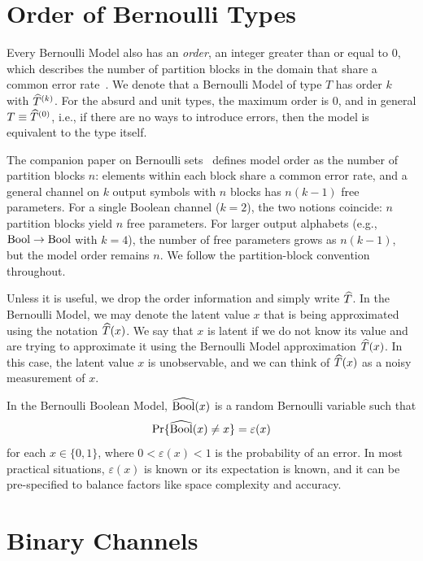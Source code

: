 \documentclass[../main.tex]{subfiles}
\begin{document}
\section{Order of Bernoulli Types}

Every Bernoulli Model also has an \emph{order}, an integer greater than or equal to 0, which describes the number of partition blocks in the domain that share a common error rate~\cite{bernoulliSets}. We denote that a Bernoulli Model of type $T$ has order $k$ with $\widehat{T}^{(k)}$. For the absurd and unit types, the maximum order is $0$, and in general $T \equiv \widehat{T}^{(0)}$, i.e., if there are no ways to introduce errors, then the model is equivalent to the type itself.

\begin{remark}
\label{rem:order_vs_dof}
The companion paper on Bernoulli sets~\cite{bernoulliSets} defines model order as the number of partition blocks $n$: elements within each block share a common error rate, and a general channel on $k$ output symbols with $n$ blocks has $n(k-1)$ free parameters. For a single Boolean channel ($k=2$), the two notions coincide: $n$ partition blocks yield $n$ free parameters. For larger output alphabets (e.g., $\mathrm{Bool} \to \mathrm{Bool}$ with $k=4$), the number of free parameters grows as $n(k-1)$, but the model order remains $n$. We follow the partition-block convention throughout.
\end{remark}

Unless it is useful, we drop the order information and simply write $\widehat{T}$. In the Bernoulli Model, we may denote the latent value $x$ that is being approximated using the notation $\widehat{T}(x)$. We say that $x$ is latent if we do not know its value and are trying to approximate it using the Bernoulli Model approximation $\widehat{T}(x)$. In this case, the latent value $x$ is unobservable, and we can think of $\widehat{T}(x)$ as a noisy measurement of $x$.

In the Bernoulli Boolean Model, $\widehat{\mathrm{Bool}}(x)$ is a random Bernoulli variable such that
\begin{equation}
\Pr\{ \widehat{\mathrm{Bool}}(x) \neq x\} = \varepsilon(x)
\end{equation}
for each $x \in \{0,1\}$, where $0 < \varepsilon(x) < 1$ is the probability of an error. In most practical situations, $\varepsilon(x)$ is known or its expectation is known, and it can be pre-specified to balance factors like space complexity and accuracy.

\section{Binary Channels}
\end{document}
